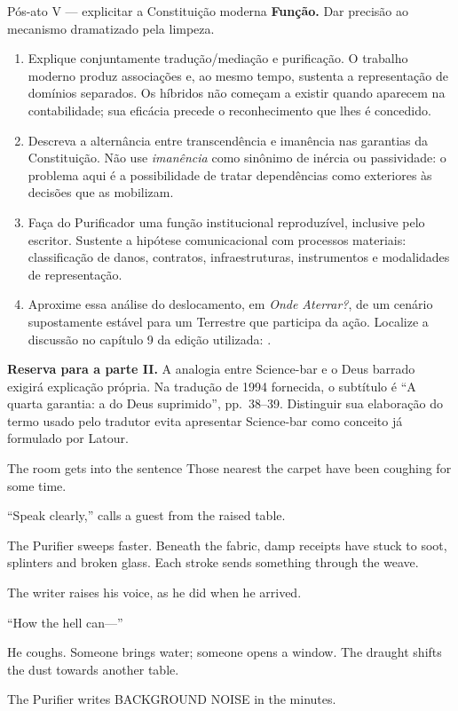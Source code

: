\begin{orientacao}{Pós-ato V --- explicitar a Constituição moderna}
\textbf{Função.} Dar precisão ao mecanismo dramatizado pela limpeza.
\begin{enumerate}
\item Explique conjuntamente tradução/mediação e purificação.
O trabalho moderno produz associações e, ao mesmo tempo, sustenta
a representação de domínios separados. Os híbridos não começam a
existir quando aparecem na contabilidade; sua eficácia precede o
reconhecimento que lhes é concedido.
\item Descreva a alternância entre transcendência e imanência nas
garantias da Constituição. Não use \textit{imanência} como sinônimo
de inércia ou passividade: o problema aqui é a possibilidade de
tratar dependências como exteriores às decisões que as mobilizam.
\item Faça do Purificador uma função institucional reproduzível,
inclusive pelo escritor. Sustente a hipótese comunicacional com
processos materiais: classificação de danos, contratos, infraestruturas,
instrumentos e modalidades de representação.
\item Aproxime essa análise do deslocamento, em \textit{Onde Aterrar?},
de um cenário supostamente estável para um Terrestre que participa
da ação. Localize a discussão no capítulo 9 da edição utilizada:
.
\end{enumerate}
\textbf{Reserva para a parte II.} A analogia entre Science-bar e o
Deus barrado exigirá explicação própria. Na tradução de 1994 fornecida,
o subtítulo é \enquote{A quarta garantia: a do Deus suprimido},
pp.~38--39. Distinguir sua elaboração do termo usado pelo tradutor
evita apresentar Science-bar como conceito já formulado por Latour.
\end{orientacao}

\begin{ato}{The room gets into the sentence}
Those nearest the carpet have been coughing for some time.

“Speak clearly,” calls a guest from the raised table.

The Purifier sweeps faster. Beneath the fabric, damp receipts have stuck
to soot, splinters and broken glass. Each stroke sends something through
the weave.

The writer raises his voice, as he did when he arrived.

“How the hell can—”

He coughs. Someone brings water; someone opens a window. The draught shifts
the dust towards another table.

The Purifier writes BACKGROUND NOISE in the minutes.
\end{ato}

